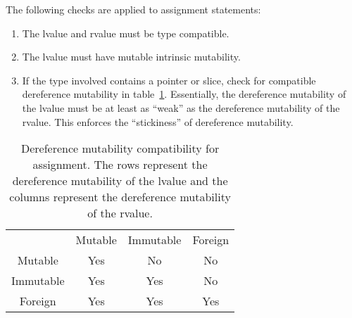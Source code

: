 
The following checks are applied to assignment statements:
\begin{enumerate}
\item The lvalue and rvalue must be type compatible.
\item The lvalue must have mutable intrinsic mutability.
\item If the type involved contains a pointer or slice, check for compatible dereference mutability in table~\ref{assignmut}.
  Essentially, the dereference mutability of the lvalue must be at least as ``weak'' as the dereference mutability of the rvalue.
  This enforces the ``stickiness'' of dereference mutability.
\end{enumerate}


\begin{table}
  \centering
  \begin{tabular}{cccc}
              & Mutable & Immutable & Foreign \\
    Mutable   & Yes     & No        & No      \\
    Immutable & Yes     & Yes       & No      \\
    Foreign   & Yes     & Yes       & Yes     \\
    \end{tabular}
  \caption{Dereference mutability compatibility for assignment.  The rows represent the dereference mutability of the lvalue and the columns represent the dereference mutability of the rvalue.\label{assignmut}}
\end{table}


